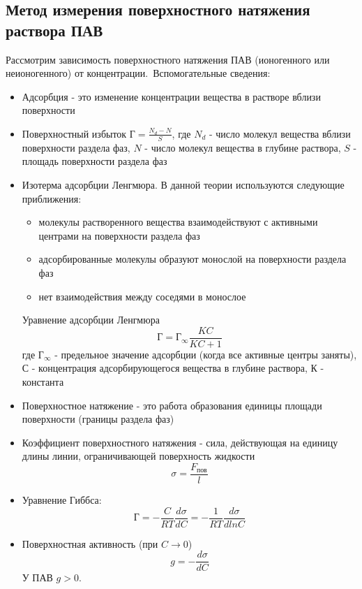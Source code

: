 \documentclass[a4paper,12pt]{article}
\begin{document}
\subsection{Метод измерения поверхностного натяжения раствора ПАВ}
Рассмотрим зависимость поверхностного натяжения ПАВ (ионогенного или неионогенного) от концентрации.\ 
Вспомогательные сведения:
\begin{itemize}
    \item Адсорбция - это изменение концентрации вещества в растворе вблизи поверхности 
    \item Поверхностный избыток $\text{Г} = \frac{N_{d} - N}{S}$, где $N_{d}$ - число молекул вещества вблизи поверхности раздела фаз, $N$ - число молекул вещества в глубине раствора, $S$ - площадь поверхности раздела фаз
    \item Изотерма адсорбции Ленгмюра. В данной теории используются следующие приближения:
    \begin{itemize}
        \item молекулы растворенного вещества взаимодействуют с активными центрами на поверхности раздела фаз
        \item адсорбированные молекулы образуют монослой на поверхности раздела фаз
        \item нет взаимодействия между соседями в монослое
    \end{itemize}
    Уравнение адсорбции Ленгмюра
    \begin{equation} \label{ленгмюр}
        \text{Г} = \text{Г}_{\infty}\frac{KC}{KC + 1}
    \end{equation}
    где $\text{Г}_{\infty}$ - предельное значение адсорбции (когда все активные центры заняты), С - концентрация адсорбирующегося вещества в глубине раствора, К - константа 
    \item Поверхностное натяжение - это работа образования единицы площади поверхности (границы раздела фаз)
    \item Коэффициент поверхностного натяжения - сила, действующая на единицу длины линии, ограничивающей поверхность жидкости
    \begin{equation} \label{sigma}
        \sigma = \frac{F_{\text{пов}}}{l}
    \end{equation} 
    \item Уравнение Гиббса:
    \begin{equation}\label{гиббс}
        \text{Г} = -\frac{C}{RT} \frac{d\sigma}{dC} = - \frac{1}{RT} \frac{d\sigma}{dlnC}
    \end{equation}\label{g}
    \item Поверхностная активность (при $C \rightarrow 0$)
    \begin{equation}
        g = -\frac{d\sigma}{dC}
    \end{equation}
    У ПАВ $g > 0$.
\end{itemize}
\end{document}
